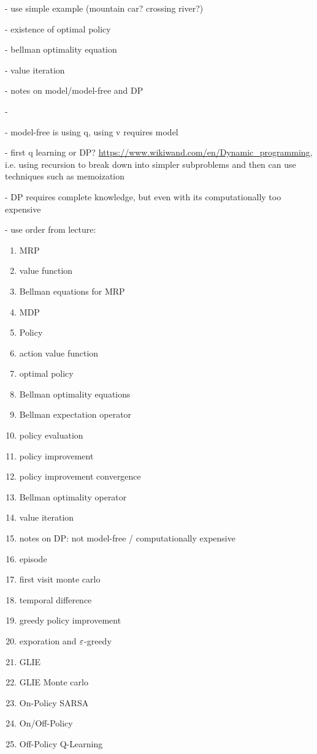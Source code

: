 \begin{notes}
    - use simple example (mountain car? crossing river?)

    - existence of optimal policy

    - bellman optimality equation

    - value iteration

    - notes on model/model-free and DP

    -

    - model-free is using q, using v requires model

    - first q learning or DP? \url{https://www.wikiwand.com/en/Dynamic_programming}, i.e. using recursion to break down into simpler subproblems and then can use techniques such as memoization

    - DP requires complete knowledge, but even with its computationally too expensive

    - use order from lecture:

    \begin{enumerate}
        \item MRP
        \item value function
        \item Bellman equations for MRP
        \item MDP
        \item Policy
        \item action value function
        \item optimal policy
        \item Bellman optimality equations
        \item Bellman expectation operator
        \item policy evaluation
        \item policy improvement
        \item policy improvement convergence
        \item Bellman optimality operator
        \item value iteration
        \item notes on DP: not model-free / computationally expensive
        \item episode
        \item first visit monte carlo
        \item temporal difference
        \item greedy policy improvement
        \item exporation and $\varepsilon$-greedy
        \item GLIE
        \item GLIE Monte carlo
        \item On-Policy SARSA
        \item On/Off-Policy
        \item Off-Policy Q-Learning
    \end{enumerate}
\end{notes}
